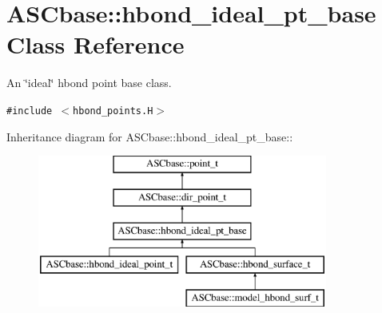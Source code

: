 \section{ASCbase::hbond\_\-ideal\_\-pt\_\-base Class Reference}
\label{classASCbase_1_1hbond__ideal__pt__base}
An \char`\"{}ideal\char`\"{} hbond point base class.  


{\tt \#include $<$hbond\_\-points.H$>$}

Inheritance diagram for ASCbase::hbond\_\-ideal\_\-pt\_\-base::\begin{figure}[H]
\begin{center}
\leavevmode
\includegraphics[height=5cm]{classASCbase_1_1hbond__ideal__pt__base}
\end{center}
\end{figure}

